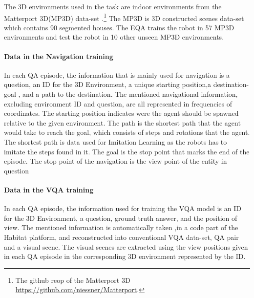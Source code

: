 The 3D environments used in the task are indoor environments from the Matterport 3D(MP3D) data-set \cite{eqa_matterport}.\footnote{ The github reop of the Matterport 3D \url{https://github.com/niessner/Matterport}.} The MP3D is 3D constructed scenes data-set which contains 90 segmented houses. The EQA trains the robot in 57 MP3D environments and test the robot in 10 other unseen MP3D environments.  

\paragraph{Data in the Navigation training}

In each QA episode, the information that is mainly used for navigation is a question,  an ID for the 3D Environment, a unique starting position,a destination-goal , and a path to the destination. The mentioned navigational information, excluding environment ID and question,  are all represented in frequencies of coordinates. The starting position indicates were the agent should be spawned relative to the given environment.  The path is the shortest path that the agent would take to reach the goal, which consists of steps and rotations that the agent. The shortest path is data used for Imitation Learning as the robots has to imitate the steps found in it. The goal is the stop point that marks the end of the episode. The stop point of the navigation is the view point of the entity in question 

\paragraph{Data in the VQA training}

In each QA episode, the information used for training the VQA model is an ID for the 3D Environment, a question, ground truth answer, and the position of view. The mentioned information is automatically taken ,in a code part of the Habitat platform, and reconstructed into conventional  VQA data-set, QA pair and a visual scene. The visual scenes are extracted using the view positions given in each QA episode in the corresponding 3D environment represented by the ID. 

